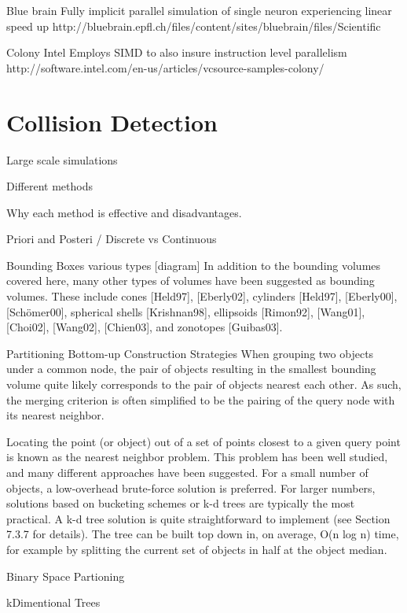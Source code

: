 \documentclass[main.tex]{subfiles}
\begin{document}
{{Blue brain
Fully implicit parallel simulation of single neuron
experiencing linear speed up
http://bluebrain.epfl.ch/files/content/sites/bluebrain/files/Scientific%

Colony Intel
Employs SIMD to also insure instruction level parallelism
http://software.intel.com/en-us/articles/vcsource-samples-colony/




\section {Collision Detection}

Large scale simulations

Different methods

Why each method is effective and disadvantages.

Priori and Posteri / Discrete vs Continuous

Bounding Boxes various types
[diagram]
In addition to the bounding volumes covered here, many other types of volumes
have been suggested as bounding volumes. These include cones [Held97], [Eberly02],
cylinders [Held97], [Eberly00], [Schömer00], spherical shells [Krishnan98], ellipsoids
[Rimon92], [Wang01], [Choi02], [Wang02], [Chien03], and zonotopes [Guibas03].


Partitioning
Bottom-up Construction Strategies
When grouping two objects under a common node, the pair of objects resulting in the smallest bounding volume quite likely corresponds to the pair of objects nearest each other. As such, the merging criterion is often simplified to be the pairing of the query node with its nearest neighbor.

Locating the point (or object) out of a set of points closest to a given query point is known as the nearest neighbor problem. This problem has been well studied, and many different approaches have been suggested. For a small number of objects, a low-overhead brute-force solution is preferred. For larger numbers, solutions based on bucketing schemes or k-d trees are typically the most practical. A k-d tree solution is quite straightforward to implement (see Section 7.3.7 for details). The tree can be built top down in, on average, O(n log n) time, for example by splitting the current set of objects in half at the object median.

Binary Space Partioning

kDimentional Trees

}}
\end{document}

